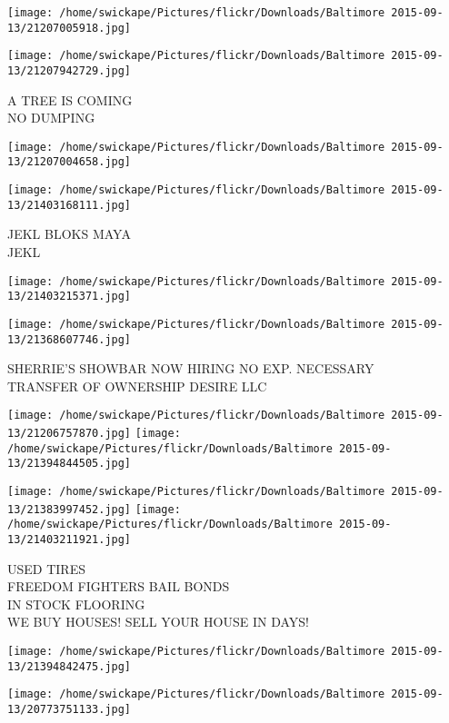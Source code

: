 \documentclass[10pt,letterpaper]{article}
\begin{document}
\texttt{[image: /home/swickape/Pictures/flickr/Downloads/Baltimore 2015-09-13/21207005918.jpg]}

\vspace{0.25in}
\texttt{[image: /home/swickape/Pictures/flickr/Downloads/Baltimore 2015-09-13/21207942729.jpg]}

A TREE IS COMING\\
NO DUMPING
\pagebreak

\texttt{[image: /home/swickape/Pictures/flickr/Downloads/Baltimore 2015-09-13/21207004658.jpg]}

\vspace{0.25in}
\texttt{[image: /home/swickape/Pictures/flickr/Downloads/Baltimore 2015-09-13/21403168111.jpg]}

JEKL BLOKS MAYA\\
JEKL
\pagebreak

\texttt{[image: /home/swickape/Pictures/flickr/Downloads/Baltimore 2015-09-13/21403215371.jpg]}

\vspace{0.25in}
\texttt{[image: /home/swickape/Pictures/flickr/Downloads/Baltimore 2015-09-13/21368607746.jpg]}

SHERRIE'S SHOWBAR NOW HIRING NO EXP. NECESSARY\\
TRANSFER OF OWNERSHIP DESIRE LLC
\pagebreak

\texttt{[image: /home/swickape/Pictures/flickr/Downloads/Baltimore 2015-09-13/21206757870.jpg]}
\texttt{[image: /home/swickape/Pictures/flickr/Downloads/Baltimore 2015-09-13/21394844505.jpg]}

\texttt{[image: /home/swickape/Pictures/flickr/Downloads/Baltimore 2015-09-13/21383997452.jpg]}
\texttt{[image: /home/swickape/Pictures/flickr/Downloads/Baltimore 2015-09-13/21403211921.jpg]}

USED TIRES\\
FREEDOM FIGHTERS BAIL BONDS\\
IN STOCK FLOORING\\
WE BUY HOUSES!  SELL YOUR HOUSE IN DAYS!
\pagebreak

\texttt{[image: /home/swickape/Pictures/flickr/Downloads/Baltimore 2015-09-13/21394842475.jpg]}

\vspace{0.25in}
\texttt{[image: /home/swickape/Pictures/flickr/Downloads/Baltimore 2015-09-13/20773751133.jpg]}
\end{document}
